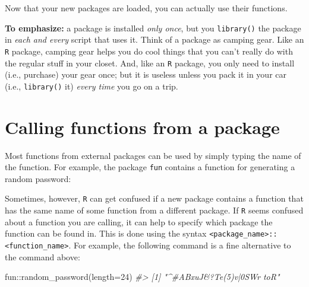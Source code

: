 \documentclass[
]{book}
\newenvironment{Shaded}{\begin{snugshade}}{\end{snugshade}}
\newcommand{\AttributeTok}[1]{\textcolor[rgb]{0.77,0.63,0.00}{#1}}
\newcommand{\CommentTok}[1]{\textcolor[rgb]{0.56,0.35,0.01}{\textit{#1}}}
\newcommand{\DecValTok}[1]{\textcolor[rgb]{0.00,0.00,0.81}{#1}}
\newcommand{\FunctionTok}[1]{\textcolor[rgb]{0.00,0.00,0.00}{#1}}
\newcommand{\NormalTok}[1]{#1}
\newcommand{\SpecialCharTok}[1]{\textcolor[rgb]{0.00,0.00,0.00}{#1}}
\begin{document}
Now that your new packages are loaded, you can actually use their functions.

\textbf{To emphasize:} a package is installed \emph{only once}, but you \texttt{library()} the package in \emph{each and every} script that uses it. Think of a package as camping gear. Like an \texttt{R} package, camping gear helps you do cool things that you can't really do with the regular stuff in your closet. And, like an \texttt{R} package, you only need to install (i.e., purchase) your gear once; but it is useless unless you pack it in your car (i.e., \texttt{library()} it) \emph{every time} you go on a trip.

\hypertarget{calling-functions-from-a-package}{%
\section*{Calling functions from a package}\label{calling-functions-from-a-package}}

Most functions from external packages can be used by simply typing the name of the function. For example, the package \texttt{fun} contains a function for generating a random password:

\begin{Shaded}
\begin{Highlighting}[]
\FunctionTok{random\_password}\NormalTok{(}\AttributeTok{length=}\DecValTok{24}\NormalTok{)}
\CommentTok{\#\textgreater{} [1] "L6k\^{}N\textgreater{}chd$7nl!]VJpsuK\textbackslash{}\textbackslash{}Ae"}
\end{Highlighting}
\end{Shaded}

Sometimes, however, \texttt{R} can get confused if a new package contains a function that has the same name of some function from a different package. If \texttt{R} seems confused about a function you are calling, it can help to specify which package the function can be found in. This is done using the syntax \texttt{\textless{}package\_name\textgreater{}::\textless{}function\_name\textgreater{}}. For example, the following command is a fine alternative to the command above:

\begin{Shaded}
\begin{Highlighting}[]
\NormalTok{fun}\SpecialCharTok{::}\FunctionTok{random\_password}\NormalTok{(}\AttributeTok{length=}\DecValTok{24}\NormalTok{)}
\CommentTok{\#\textgreater{} [1] "\^{}\#ABxuJ\&?Te(5)v|0SWr toR"}
\end{Highlighting}
\end{Shaded}
\end{document}
